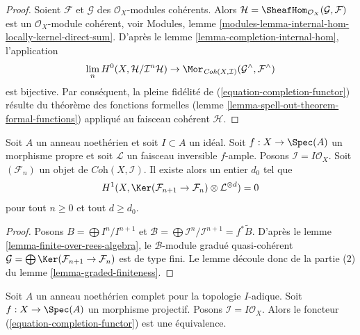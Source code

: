 \begin{proof}
Soient $\mathcal{F}$ et $\mathcal{G}$ des $\mathcal{O}_X$-modules cohérents.
Alors $\mathcal{H} = \SheafHom_{\mathcal{O}_X}(\mathcal{G}, \mathcal{F})$
est un $\mathcal{O}_X$-module cohérent,
voir Modules, lemme \ref{modules-lemma-internal-hom-locally-kernel-direct-sum}.
D'après le lemme \ref{lemma-completion-internal-hom}, l'application
$$
\lim_n H^0(X, \mathcal{H}/\mathcal{I}^n\mathcal{H})
\to
\Mor_{\textit{Coh}(X, \mathcal{I})}
(\mathcal{G}^\wedge, \mathcal{F}^\wedge)
$$
est bijective. Par conséquent, la pleine fidélité de
(\ref{equation-completion-functor}) résulte du théorème des fonctions
formelles (lemme \ref{lemma-spell-out-theorem-formal-functions})
appliqué au faisceau cohérent $\mathcal{H}$.
\end{proof}

\begin{lemma}
\label{lemma-vanishing-projective}
Soit $A$ un anneau noethérien et soit $I \subset A$ un idéal.
Soit $f : X \to \Spec(A)$ un morphisme propre et soit
$\mathcal{L}$ un faisceau inversible $f$-ample. Posons
$\mathcal{I} = I\mathcal{O}_X$. Soit $(\mathcal{F}_n)$ un objet
de $\textit{Coh}(X, \mathcal{I})$. Il existe alors un
entier $d_0$ tel que
$$
H^1(X, \Ker(\mathcal{F}_{n + 1} \to \mathcal{F}_n)
\otimes \mathcal{L}^{\otimes d} )
= 0
$$
pour tout $n \geq 0$ et tout $d \geq d_0$.
\end{lemma}

\begin{proof}
Posons $B = \bigoplus I^n/I^{n + 1}$ et
$\mathcal{B} = \bigoplus \mathcal{I}^n/\mathcal{I}^{n + 1} = f^*\widetilde{B}$.
D'après le lemme \ref{lemma-finite-over-rees-algebra}, le
$\mathcal{B}$-module gradué quasi-cohérent
$\mathcal{G} = \bigoplus \Ker(\mathcal{F}_{n + 1} \to \mathcal{F}_n)$
est de type fini. Le lemme découle donc de la partie (2) du
lemme \ref{lemma-graded-finiteness}.
\end{proof}

\begin{lemma}
\label{lemma-existence-projective}
Soit $A$ un anneau noethérien complet pour la topologie $I$-adique.
Soit $f : X \to \Spec(A)$ un morphisme projectif. Posons
$\mathcal{I} = I\mathcal{O}_X$.
Alors le foncteur (\ref{equation-completion-functor}) est une équivalence.
\end{lemma}

